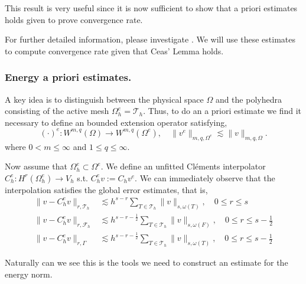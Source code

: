 This result is very useful since it is now sufficient to show that a priori estimates holds given to prove convergence rate.

For further detailed information, please investigate \cite[Chapter 1.6]{ern04}.
We will use these estimates to compute convergence rate given that Ceas' Lemma holds.


\subsubsection{Energy a priori estimates.  }%
\label{ssub:extension}

A key idea is to distinguish between the physical space $\Omega $ and the polyhedra consisting of the active mesh $\Omega ^{e}_{h} = \mathcal{T}_{h}$. Thus, to do an
a priori estimate we find it necessary to define an bounded extension operator satisfying, \[
( \cdot ) ^{e}: W^{m,q}( \Omega )  \to W^{m,q} ( \Omega ^{e}), \quad \| v^{e} \|_{ m,q,\Omega ^{e}  }^{  } \lesssim \| v \|_{ m,q, \Omega  }^{  }.
\]
where $0< m \le \infty$ and $1 \le q \le \infty$.

Now assume that $\Omega _{h}^{e} \subset  \Omega^{e} $. We define an unfitted Cléments interpolator $C_{h}^{e}: H^{r}( \Omega ^{e}_{h}) \to V_{h}$
s.t.  $C ^{e} _{h} v := C _{h} v^{e} $.
We can immediately observe that the interpolation satisfies the global error estimates, that is,
\begin{align}
    \label{eq:bi_projection_estimates_1}
    \| v - C _{h}^{e} v \|_{  r, \mathcal{T} _{h} }^{  } & \lesssim h^{s-r}\sum_{T \in \mathcal{T}_h} \| v \|_{ s, \omega(T) }^{  }, \quad 0\le r\le s \\
    \label{eq:bi_projection_estimates_2}
\| v - C ^{e}_{h}v \|_{ r,\mathcal{F} _{h} }^{  } & \lesssim h^{s-r-\frac{1}{2}}\sum_{T \in \mathcal{T}_h} \| v \|_{ s, \omega(F)  }^{  }, \quad 0  \le  r \le   s- \frac{1}{2} \\
    \label{eq:bi_projection_estimates_3}
\| v - C ^{e}_{h}v \|_{ r, \Gamma }^{  } & \lesssim h^{s-r-\frac{1}{2}} \sum_{T \in \mathcal{T}_h}  \| v \|_{ s,  \omega(T)  }^{  }, \quad 0  \le  r \le   s- \frac{1}{2}
\end{align}

Naturally can we see this is the tools we need to construct an estimate for the energy norm.

